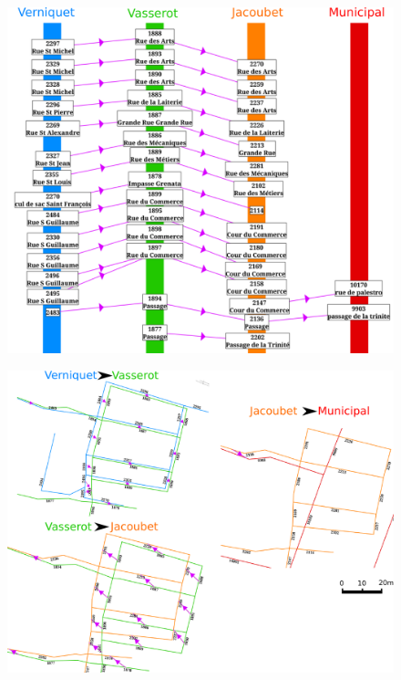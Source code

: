 \documentclass[a4paper,12pt]{article}
\begin{document}
\begin{figure}
\includegraphics[width=0.8\paperwidth]{./images/illus_graphs/graphe_untagged_greneta.png}
\end{figure}

\begin{figure}
\includegraphics[angle = 90, width=1\textwidth]{./images/illus_graphs/graphe_1_1_greneta.png}
\end{figure}
\end{document}
